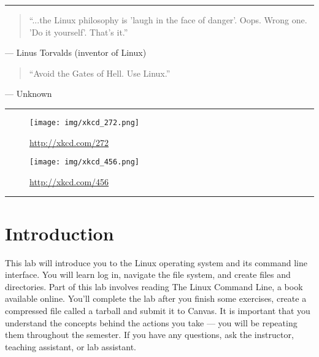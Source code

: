 \documentclass[11pt]{cselabheader}
\title{\thetitle}
\author{\theauthor}
\date{NMT Department of Computer Science and Engineering}
\begin{document}
\maketitle
\hrule

\begin{quotation} ``...the Linux philosophy is 'laugh in the face of danger'. Oops. Wrong one. 'Do it yourself'. That's it.'' \end{quotation}

\begin{flushright} --- Linus Torvalds (inventor of Linux) \end{flushright}\begin{quotation} ``Avoid the Gates of Hell. Use Linux.'' \end{quotation}

\begin{flushright} --- Unknown \end{flushright}

\vspace{1em}
\hrule

\begin{figure}[H]
  \centering
  \texttt{[image: img/xkcd\_272.png]}
  \caption{\url{http://xkcd.com/272}}
\end{figure}

\begin{figure}[H]
  \centering
  \texttt{[image: img/xkcd\_456.png]}
  \caption{\url{http://xkcd.com/456}}
\end{figure}

\hrule
\newpage

\section*{Introduction}

This lab will introduce you to the Linux operating system and its command line
interface. You will learn log in, navigate the file system, and create files
and directories.  Part of this lab involves reading The Linux Command Line, a
book available online.  You'll complete the lab after you finish some
exercises, create a compressed file called a tarball and submit it to Canvas.
It is important that you understand the concepts behind the actions you take
--- you will be repeating them throughout the semester. If you have any
questions, ask the instructor, teaching assistant, or lab assistant.

\tableofcontents
\end{document}
